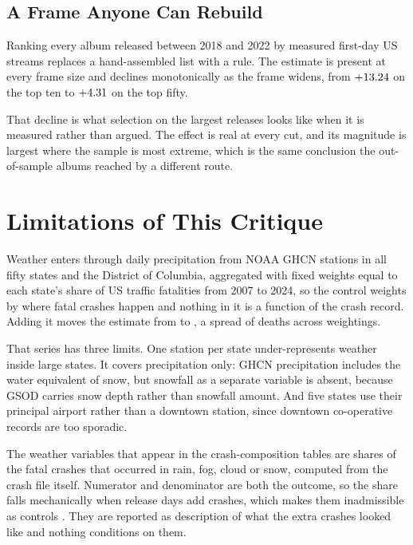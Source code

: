 \documentclass[11pt]{article}
\begin{document}


\subsection{A Frame Anyone Can Rebuild}

Ranking every album released between 2018 and 2022 by measured first-day US streams
replaces a hand-assembled list with a rule. The estimate is present at every frame size
and declines monotonically as the frame widens, from $+13.24$ on the top ten
to $+4.31$ on the top fifty.



That decline is what selection on the largest releases looks like when it is measured
rather than argued. The effect is real at every cut, and its magnitude is largest where
the sample is most extreme, which is the same conclusion the out-of-sample albums reached
by a different route.

\section{Limitations of This Critique}
\label{sec:limits}

Weather enters through daily precipitation from NOAA GHCN stations in all fifty states and the
District of Columbia, aggregated with fixed weights equal to each state's share of US traffic
fatalities from 2007 to 2024, so the control weights by where fatal crashes happen and nothing in
it is a function of the crash record. Adding it moves the estimate from \numEffectNoWeather{} to
\numEffectWeatherControlled{}, a spread of \numWeatherSpread{} deaths across weightings.



That series has three limits. One station per state under-represents weather inside large states.
It covers precipitation only: GHCN precipitation includes the water equivalent of snow, but
snowfall as a separate variable is absent, because GSOD carries snow depth rather than snowfall
amount. And five states use their principal airport rather than a downtown station, since downtown
co-operative records are too sporadic.

The weather variables that appear in the crash-composition tables are shares of the fatal crashes
that occurred in rain, fog, cloud or snow, computed from the crash file itself. Numerator and
denominator are both the outcome, so the share falls mechanically when release days add crashes,
which makes them inadmissible as controls \citep{angrist2009mostly}. They are reported as
description of what the extra crashes looked like and nothing conditions on them.
\end{document}

